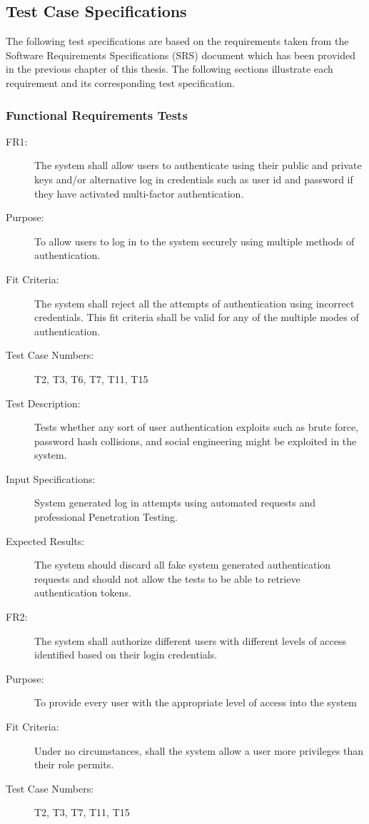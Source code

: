 \documentclass[a4paper,twoside,phd]{BYUPhys}
\begin{document}
\subsection{Test Case Specifications}
The following test specifications are based on the requirements taken from the Software Requirements Specifications (SRS) document which has been provided in the previous chapter of this thesis. The following sections illustrate each requirement and its corresponding test specification. 
\subsubsection{Functional Requirements Tests}
\begin{description}
\item[FR1:] The system shall allow users to authenticate using their public and private keys and/or alternative log in credentials such as user id and password if they have activated multi-factor authentication.
\item[Purpose:] To allow users to log in to the system securely using multiple methods of authentication.
\item[Fit Criteria:] The system shall reject all the attempts of authentication using incorrect credentials. This fit criteria shall be valid for any of the multiple modes of authentication.
\item[Test Case Numbers:] T2, T3, T6, T7, T11, T15
\item[Test Description:] Tests whether any sort of user authentication exploits such as brute force, password hash collisions, and social engineering might be exploited in the system.
\item[Input Specifications:] System generated log in attempts using automated requests and professional Penetration Testing.
\item[Expected Results:] The system should discard all fake system generated authentication requests and should not allow the tests to be able to retrieve authentication tokens.
\\
\item[FR2:] The system shall authorize different users with different levels of access identified based on their login credentials.
\item[Purpose:] To provide every user with the appropriate level of access into the system
\item[Fit Criteria:] Under no circumstances, shall the system allow a user more privileges than their role permits.
\item[Test Case Numbers:] T2, T3, T7, T11, T15

\end{description}
\end{document}
